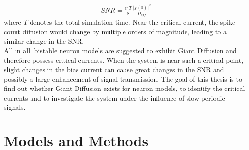 \documentclass[12pt,a4paper]{article}
\begin{document}
\begin{align*}
SNR=\frac{\epsilon ^2T}{8}\frac{|\chi(0)|^2}{D_{eff}}
\end{align*}
where $T$ denotes the total simulation time. Near the critical current, the spike count diffusion would change by multiple orders of magnitude, leading to a similar change in the SNR. \\
All in all, bistable neuron models are suggested to exhibit Giant Diffusion and therefore possess critical currents. When the system is near such a critical point, slight changes in the bias current can cause great changes in the SNR and possibly a large enhancement of signal transmission. The goal of this thesis is to find out whether Giant Diffusion exists for neuron models, to identify the critical currents and to investigate the system under the influence of slow periodic signals. 
\newpage
\section{Models and Methods}
\end{document}
